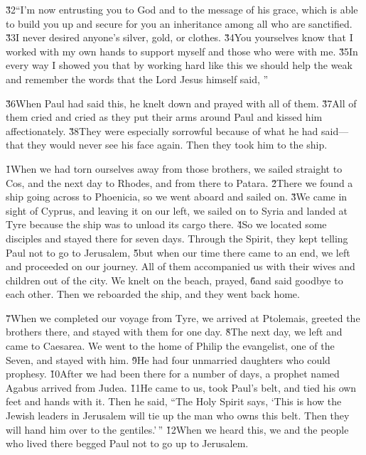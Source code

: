 \v{32}``I'm now entrusting you to God and to the message of his grace, which is able to build you up and secure for you an inheritance among all who are sanctified. \v{33}I never desired anyone's silver, gold, or clothes. \v{34}You yourselves know that I worked with my own hands to support myself and those who were with me. \v{35}In every way I showed you that by working hard like this we should help the weak and remember the words that the Lord Jesus himself said, ''

\v{36}When Paul had said this, he knelt down and prayed with all of them. \v{37}All of them cried and cried as they put their arms around Paul and kissed him affectionately. \v{38}They were especially sorrowful because of what he had said---that they would never see his face again. Then they took him to the ship.

\v{1}When we had torn ourselves away from those brothers, we sailed straight to Cos, and the next day to Rhodes, and from there to Patara. \v{2}There we found a ship going across to Phoenicia, so we went aboard and sailed on. \v{3}We came in sight of Cyprus, and leaving it on our left, we sailed on to Syria and landed at Tyre because the ship was to unload its cargo there. \v{4}So we located some disciples and stayed there for seven days. Through the Spirit, they kept telling Paul not to go to Jerusalem, \v{5}but when our time there came to an end, we left and proceeded on our journey. All of them accompanied us with their wives and children out of the city. We knelt on the beach, prayed, \v{6}and said goodbye to each other. Then we reboarded the ship, and they went back home.

\v{7}When we completed our voyage from Tyre, we arrived at Ptolemais, greeted the brothers there, and stayed with them for one day. \v{8}The next day, we left and came to Caesarea. We went to the home of Philip the evangelist, one of the Seven, and stayed with him. \v{9}He had four unmarried daughters who could prophesy. \v{10}After we had been there for a number of days, a prophet named Agabus arrived from Judea. \v{11}He came to us, took Paul's belt, and tied his own feet and hands with it. Then he said, ``The Holy Spirit says, `This is how the Jewish leaders in Jerusalem will tie up the man who owns this belt. Then they will hand him over to the gentiles.'\,'' \v{12}When we heard this, we and the people who lived there begged Paul not to go up to Jerusalem.

